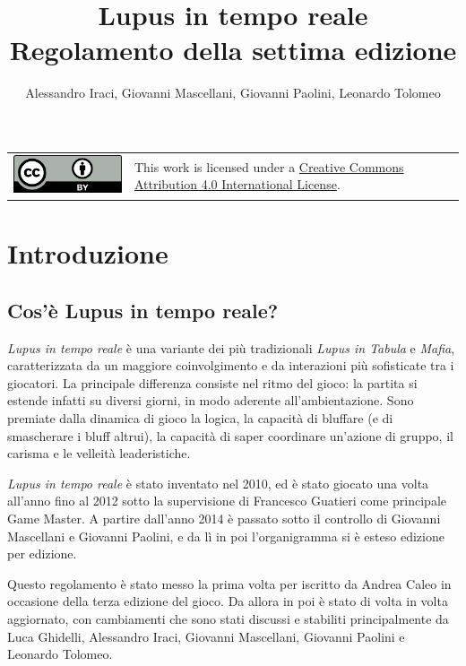 \documentclass[a4paper,10pt]{article}
\title{Lupus in tempo reale\\ Regolamento della settima edizione}
\author{Alessandro Iraci, Giovanni Mascellani, Giovanni Paolini, Leonardo Tolomeo}
\begin{document}
\maketitle

\begin{tabular}{lp{}}
 \begin{minipage}{0.22\textwidth}
  \vspace{3mm}
  \href{http://creativecommons.org/licenses/by/4.0/}{\includegraphics{ccby.pdf}}
 \end{minipage}
 &
 This work is licensed under a \href{http://creativecommons.org/licenses/by/4.0/}{Creative Commons Attribution 4.0 International License}.
\end{tabular}


\section{Introduzione}

\subsection{Cos'è Lupus in tempo reale?}

\emph{Lupus in tempo reale} è una variante dei più tradizionali \emph{Lupus in Tabula} e \emph{Mafia}, caratterizzata da un maggiore coinvolgimento e da interazioni più sofisticate tra i giocatori.
La principale differenza consiste nel ritmo del gioco: la partita si estende infatti su diversi giorni, in modo aderente all'ambientazione.
Sono premiate dalla dinamica di gioco la logica, la capacità di bluffare (e di smascherare i bluff altrui), la capacità di saper coordinare un’azione di gruppo, il carisma e le velleità leaderistiche.

\emph{Lupus in tempo reale} è stato inventato nel 2010, ed è stato giocato una volta all'anno fino al 2012 sotto la supervisione di Francesco Guatieri come principale Game Master. A partire dall'anno 2014 è passato sotto il controllo di Giovanni Mascellani e Giovanni Paolini, e da lì in poi l'organigramma si è esteso edizione per edizione.

Questo regolamento è stato messo la prima volta per iscritto da Andrea Caleo in occasione della terza edizione del gioco. Da allora in poi è stato di volta in volta aggiornato, con cambiamenti che sono stati discussi e stabiliti principalmente da Luca Ghidelli, Alessandro Iraci, Giovanni Mascellani, Giovanni Paolini e Leonardo Tolomeo.
\end{document}
